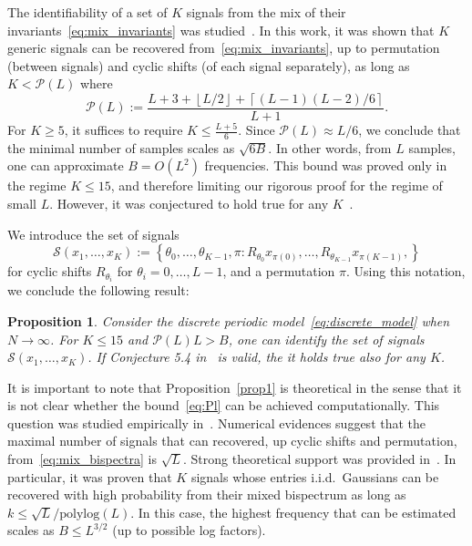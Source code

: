 \documentclass[english,12pt]{article}
\newcommand{\TODO}[1]{{\color{red}{[#1]}}}
\numberwithin{equation}{section}
\numberwithin{thm}{section} %
\newtheorem{prop}[thm]{Proposition}
\begin{document}
The identifiability of a set of $K$ signals from the mix of their  invariants~\eqref{eq:mix_invariants} was studied~\cite{bandeira2017estimation}. In this work, it was shown that $K$ generic signals can be recovered from~\eqref{eq:mix_invariants}, up to permutation (between signals) and cyclic shifts (of each signal separately), as long as $K<\mathcal{P}(L)$ where
\begin{equation} \label{eq:Pl}
\mathcal{P}(L) := \frac{L+3+\left\lfloor L/2\right\rfloor +  \left\lceil (L-1)(L-2)/6\right\rceil}{L+1}.
\end{equation}
For $K\geq 5$, it suffices to require $K\leq \frac{L+5}{6}$. 
Since $\mathcal{P}(L) \approx L/6$, we conclude that the minimal number of samples scales as $\sqrt{6B}$. In other words, from $L$ samples, one can approximate  $B=O(L^2)$ frequencies. 
This bound was proved only in the regime $K\leq 15$, and therefore limiting our rigorous proof for the regime of small $L$. 
However, it was conjectured  to hold true for any $K$~\cite[Conjecture 5.4]{bandeira2017estimation}. \TODO{To stress the difference between identify the signals, and recover them.}

We introduce the set of signals \TODO{to explain where this set comes from}
\begin{equation}
\mathcal{S}(x_1,\ldots,x_K):=\left\{ \theta_0,\ldots,\theta_{K-1},\pi : R_{\theta_0}x_{\pi(0)}, \ldots,R_{\theta_{K-1}}x_{\pi(K-1)},
 \right\}
\end{equation}
for cyclic shifts $R_{\theta_i}$ for $\theta_i=0,\ldots,L-1$, and a permutation $\pi$. Using this notation, we conclude the following result:
\begin{prop} \label{prop1}
Consider the  discrete periodic model~\eqref{eq:discrete_model} when $N\to\infty$. 
For $K\leq 15$ and  $\mathcal{P}(L)L>B$, one can identify the set of signals $\mathcal{S}(x_1,\ldots,x_K)$.
If Conjecture 5.4 in~\cite{bandeira2017estimation} is valid, the it holds true also for any $K$.
\end{prop}	

It is important to note that Proposition~\eqref{prop1} is theoretical in the sense that it is not clear whether the bound~\eqref{eq:Pl} can be achieved computationally.  
This question was studied empirically in~\cite{boumal2018heterogeneous}. Numerical evidences suggest that the maximal number of signals that can recovered, up cyclic shifts and permutation, from~\eqref{eq:mix_bispectra} is $\sqrt{L}$. 
Strong theoretical support was provided in~\cite{weinthesis}. In particular,  it was proven that $K$ signals whose entries i.i.d.\ Gaussians can be recovered with high probability from their mixed bispectrum as long as $k\leq \sqrt{L}/\text{polylog}(L)$.
In this case, the highest frequency that can be estimated scales as $B\leq L^{3/2}$ (up to possible log factors). 
\end{document}
